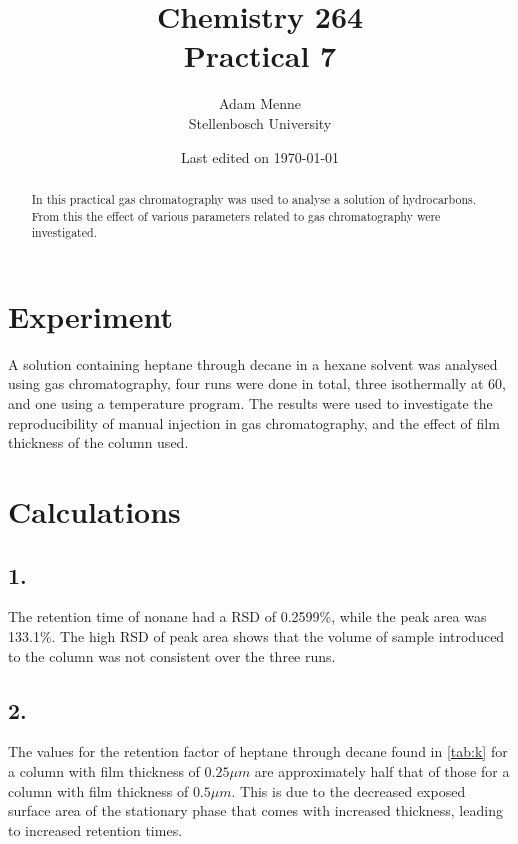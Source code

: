 \documentclass[a4paper, british]{article}
\title{Chemistry 264\\ Practical 7}
\date{Last edited on \today}
\author{Adam Menne\\ Stellenbosch University}
\begin{document}
\maketitle

\begin{abstract}
\noindent
In this practical gas chromatography was used to analyse a solution of hydrocarbons. From this the effect of various parameters related to gas chromatography were investigated.
\end{abstract}

\tableofcontents

\newpage

\section{Experiment}

A solution containing heptane through decane in a hexane solvent was analysed using gas chromatography, four runs were done in total, three isothermally at 60\textcelsius{}, and one using a temperature program. The results were used to investigate the reproducibility of manual injection in gas chromatography, and the effect of film thickness of the column used.


\section{Calculations}

\subsection*{1.}

The retention time of nonane had a RSD of 0.2599\%, while the peak area was 133.1\%. The high RSD of peak area shows that the volume of sample introduced to the column was not consistent over the three runs.

\subsection*{2.}

The values for the retention factor of heptane through decane found in \cref*{tab:k} for a column with film thickness of \(0.25\mu m\) are approximately half that of those for a column with film thickness of \(0.5\mu m\). This is due to the decreased exposed surface area of the stationary phase that comes with increased thickness, leading to increased retention times.
\end{document}
